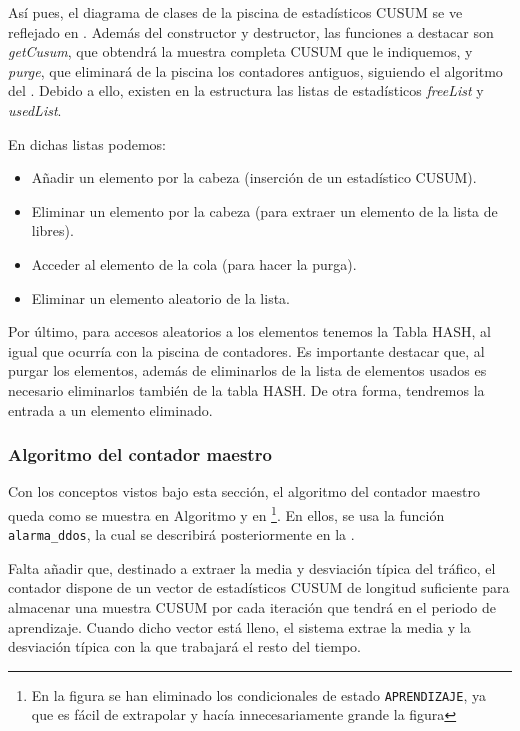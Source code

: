 Así pues, el diagrama de clases de la piscina de estadísticos \gls{CUSUM} se ve reflejado en . 
Además del constructor y destructor, las funciones a destacar son \emph{getCusum}, que obtendrá la muestra completa 
\gls{CUSUM} que le indiquemos, y \emph{purge}, que eliminará de la piscina los contadores antiguos, siguiendo el 
algoritmo del . Debido a ello, existen en la estructura las listas de estadísticos \emph{freeList} 
y \emph{usedList}.

En dichas listas podemos:
\begin{itemize}
 \item Añadir un elemento por la cabeza (inserción de un estadístico CUSUM).
 \item Eliminar un elemento por la cabeza (para extraer un elemento de la lista de libres).
 \item Acceder al elemento de la cola (para hacer la purga).
 \item Eliminar un elemento aleatorio de la lista.
\end{itemize}

Por último, para accesos aleatorios a los elementos tenemos la Tabla HASH, al igual que ocurría con la piscina de 
contadores. Es importante destacar que, al purgar los elementos, además de eliminarlos de la lista de elementos usados 
es necesario eliminarlos también de la tabla HASH. De otra forma, tendremos la entrada a un elemento eliminado.

\subsubsection{Algoritmo del contador maestro}

Con los conceptos vistos bajo esta sección, el algoritmo del contador maestro queda como se muestra en Algoritmo 
 y en \footnote{En la figura se han eliminado los 
condicionales de estado \texttt{APRENDIZAJE}, ya que es fácil de extrapolar y hacía innecesariamente grande la figura}. 
En ellos, se usa la función \texttt{alarma\_ddos}, la cual se describirá posteriormente en la .

Falta añadir que, destinado a extraer la media y desviación típica del tráfico, el contador dispone de un vector de 
estadísticos \gls{CUSUM} de longitud suficiente para almacenar una muestra \gls{CUSUM} por cada iteración que tendrá en 
el periodo de aprendizaje. Cuando dicho vector está lleno, el sistema extrae la media y la desviación típica con la que 
trabajará el resto del tiempo.

